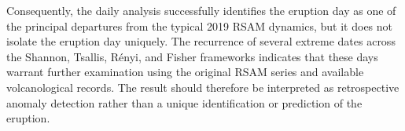 \documentclass[12pt,a4paper]{article}
\begin{document}
Consequently, the daily analysis successfully identifies the eruption day as one of the principal departures from the typical 2019 RSAM dynamics, but it does not isolate the eruption day uniquely. The recurrence of several extreme dates across the Shannon, Tsallis,
R\'enyi, and Fisher frameworks indicates that these days warrant further examination using the original RSAM series and available volcanological records. The result should therefore be interpreted as retrospective anomaly detection rather than a unique identification or
prediction of the eruption.




	


%
\end{document}
